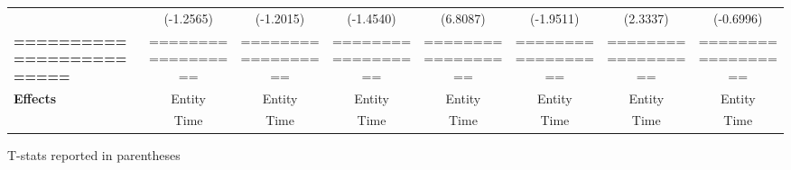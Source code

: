 \begin{center}
\begin{tabular}{lccccccc}
\textbf{ }                         &      (-1.2565)       &          (-1.2015)          &          (-1.4540)           &               (6.8087)              &            (-1.9511)             &           (2.3337)          &           (-0.6996)            \\
\textbf{=========================} &  ==================  &      ==================     &      ==================      &          ==================         &        ==================        &      ==================     &       ==================       \\
\textbf{Effects}                   &        Entity        &            Entity           &            Entity            &                Entity               &              Entity              &            Entity           &             Entity             \\
\textbf{}                          &         Time         &             Time            &             Time             &                 Time                &               Time               &             Time            &              Time              \\
\bottomrule
\end{tabular}
\end{center}

T-stats reported in parentheses